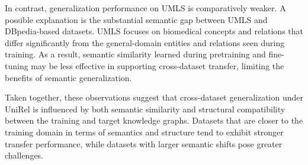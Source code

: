 In contrast, generalization performance on UMLS is comparatively weaker.
A possible explanation is the substantial semantic gap between UMLS and DBpedia-based datasets.
UMLS focuses on biomedical concepts and relations that differ significantly from the general-domain entities and relations seen during training.
As a result, semantic similarity learned during pretraining and fine-tuning may be less effective in supporting cross-dataset transfer, limiting the benefits of semantic generalization.

Taken together, these observations suggest that cross-dataset generalization under UniRel is influenced by both semantic similarity and structural compatibility between the training and target knowledge graphs.
Datasets that are closer to the training domain in terms of semantics and structure tend to exhibit stronger transfer performance, while datasets with larger semantic shifts pose greater challenges.


